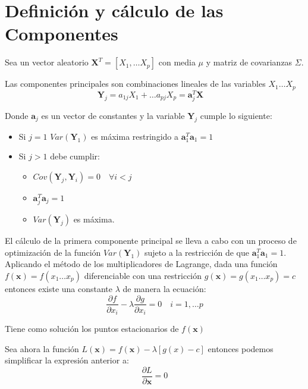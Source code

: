 \section{Definición y cálculo de las Componentes}

Sea un vector aleatorio $\textbf{X}^T=[X_1,\ldots X_p]$ con media $\mu$ y matriz de covarianzas $\Sigma$. 
\begin{defi}
Las componentes principales son combinaciones lineales de las variables $X_1 \ldots X_p$
\begin{equation}
\textbf{Y}_j=a_{1j}X_1+\ldots a_{pj}X_p=\textbf{a}_j^T\textbf{X}\quad 
\end{equation}

\noindent Donde $\textbf{a}_j$ es un vector de constantes y la variable $\textbf{Y}_j$ cumple lo siguiente:
\begin{itemize}
\item Si $j=1$ $Var(\textbf{Y}_1)$ es máxima restringido a $\textbf{a}_1^T \textbf{a}_1=1$
\item Si $j>1$ debe cumplir:
\begin{itemize}
\item $Cov(\textbf{Y}_j,\textbf{Y}_i)=0\quad \forall i<j $
\item $\textbf{a}_j^T \textbf{a}_j=1$
\item $Var(\textbf{Y}_j)$ es máxima. 
\end{itemize}

\end{itemize}

\end{defi}

\noindent El cálculo de la primera componente principal se lleva a cabo con un proceso de optimización de la función $Var(\textbf{Y}_1)$ sujeto a la restricción de que $\textbf{a}_1^T\textbf{a}_1=1$. Aplicando el método de los multiplicadores de Lagrange, dada una función $f(\textbf{x})=f(x_1\ldots x_p)$ diferenciable con una restricción $g(\textbf{x})=g(x_1\ldots x_p)=c$ entonces existe una constante $\lambda$ de manera la ecuación:
\begin{equation}
\dfrac{\partial f}{\partial x_i}-\lambda\dfrac{\partial g}{\partial x_i}=0 \quad i=1,\ldots p 
\end{equation}

\noindent Tiene como solución los puntos estacionarios de $f(\textbf{x})$

\newpage
Sea ahora la función $L(\textbf{x})= f(\textbf{x})-\lambda[g(x)-c]$  entonces podemos simplificar la expresión anterior a:
\begin{equation}
\dfrac{\partial L}{\partial \textbf{x}}=0
\end{equation}

